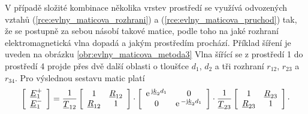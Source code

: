 V případě složité kombinace několika vrstev prostředí se využívá odvozených vztahů (\ref{rce:evlny_maticova_rozhrani}) a (\ref{rce:evlny_maticova_pruchod}) tak, že se postupně za sebou násobí takové matice, podle toho na jaké rozhraní elektromagnetická vlna dopadá a jakým prostředím prochází. Příklad šíření je uveden na obrázku \ref{obr:evlny_maticova_metoda3} Vlna šířící se z prostředí 1 do prostředí 4 projde přes dvě další oblasti o tloušťce $d_{1}$, $d_{2}$ a tři rozhraní $r_{12}$, $r_{23}$ a $r_{34}$. Pro výslednou sestavu matic platí 
\begin{displaymath}
\left[ \begin{array}{c}
{\underline{E}}_{1}^{+} \\
{\underline{E}}_{1}^{-} \\
\end{array} \right]
=
\frac{1}{{\underline{T}}_ {12}}
\left[ \begin{array}{cc}
1 & {\underline{R}}_{12} \\
{\underline{R}}_{12} & 1 \\
\end{array} \right]
\cdot
\left[ \begin{array}{cc}
\mathrm{e\,}^{\mathrm{j}{\underline{k}}_{2} d_{1}} & 0 \\
0 & \mathrm{e\,}^{-\mathrm{j}{\underline{k}}_{2} d_{1}} \\
\end{array} \right]
\cdot
\frac{1}{{\underline{T}}_ {23}}
\left[ \begin{array}{cc}
1 & {\underline{R}}_{23} \\
{\underline{R}}_{23} & 1 \\
\end{array} \right]
\cdot
\end{displaymath}

